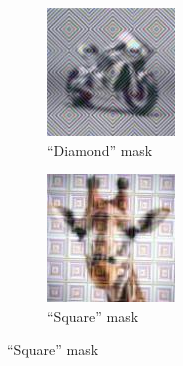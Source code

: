 \documentclass[a4paper, oneside]{discothesis}
\begin{document}
\begin{figure}[th]
	\begin{subfigure}[t]{0.19\textwidth}\centering\includegraphics[width=\linewidth]{figures/hcaptcha-diamond.png}\caption{``Diamond'' mask}\label{fig:subfig2}\end{subfigure}
	\hfill
	\begin{subfigure}[t]{0.19\textwidth}\centering\includegraphics[width=\linewidth]{figures/hcaptcha-square.png}\caption{``Square'' mask}\label{fig:subfig3}\end{subfigure}

\end{figure}
\end{document}
